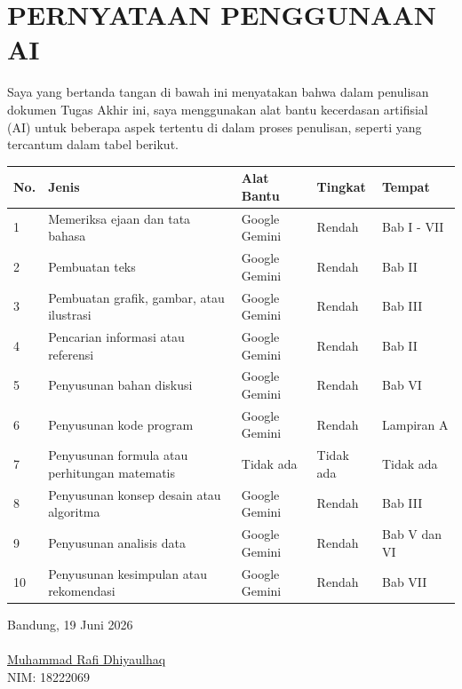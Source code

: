 \chapter*{PERNYATAAN PENGGUNAAN AI}
Saya yang bertanda tangan di bawah ini menyatakan bahwa dalam penulisan dokumen Tugas Akhir ini,
saya menggunakan alat bantu kecerdasan artifisial (AI) untuk beberapa aspek tertentu di dalam proses penulisan,
seperti yang tercantum dalam tabel berikut.

\begin{table}[h]
\begin{tabular}{|p{0.5cm}| p{4cm} | p{2.5cm} | p{2.5cm} | p{3cm} @{}| }
\hline
\textbf{No.} & \textbf{Jenis} & \textbf{Alat Bantu} & \textbf{Tingkat} & \textbf{Tempat}\\
\hline
1 & Memeriksa ejaan dan tata bahasa & Google Gemini & Rendah & Bab I - VII \\
\hline
2 & Pembuatan teks & Google Gemini & Rendah & Bab II \\
\hline
3 & Pembuatan grafik, gambar, atau ilustrasi & Google Gemini & Rendah & Bab III \\
\hline
4 & Pencarian informasi atau referensi & Google Gemini & Rendah & Bab II \\
\hline
5 & Penyusunan bahan diskusi & Google Gemini & Rendah & Bab VI \\
\hline
6 & Penyusunan kode program & Google Gemini & Rendah & Lampiran A \\
\hline
7 & Penyusunan formula atau perhitungan matematis & Tidak ada & Tidak ada & Tidak ada \\
\hline
8 & Penyusunan konsep desain atau algoritma & Google Gemini & Rendah & Bab III \\
\hline
9 & Penyusunan analisis data & Google Gemini & Rendah & Bab V dan VI \\
\hline
10 & Penyusunan kesimpulan atau rekomendasi & Google Gemini & Rendah & Bab VII \\
\hline
\end{tabular}
\end{table}

\vspace{1cm}
Bandung, 19 Juni 2026\\
\\[2cm]

\underline{Muhammad Rafi Dhiyaulhaq} \\
NIM: 18222069